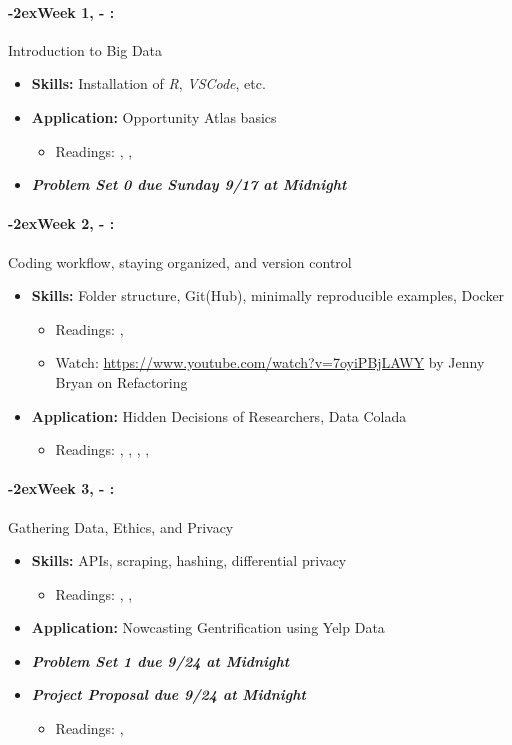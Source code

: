 \documentclass[11pt]{article}
\newcommand{\week}[1]{%
  \paragraph*{\kern-2ex\quad #1, \AdvanceDate[1]\syldate{\today} - \AdvanceDate[2]\syldate{\today}:}%
  \ifdim\wd1=\wd\MONDAY
    \AdvanceDate[7]
  \else
    \AdvanceDate[7]
  \fi%
}
\begin{document}
\normalsize

\SetDate[28/08/2023]
\week{Week 1} Introduction to Big Data
\begin{itemize}
  \item \textbf{Skills:} Installation of \textit{R}, \textit{VSCode}, etc.
  \item \textbf{Application:} Opportunity Atlas basics
  \begin{itemize}
    \item Readings: \textbf{\cite{chetty2018opportunityatlas}}, \cite{chetty2020opportunity}, \cite{einav2014ageofbigdata}
  \end{itemize}
  \item \textit{\textbf{Problem Set 0 due Sunday 9/17 at Midnight}}
\end{itemize}
\week{Week 2} Coding workflow, staying organized, and version control
\begin{itemize}
  \item \textbf{Skills:} Folder structure, Git(Hub), minimally reproducible examples, Docker
  \begin{itemize}
    \item Readings: \textbf{\cite{gentzkowshapiro2014code}}, \cite{mcdermott2022docker}
    \item Watch: \url{https://www.youtube.com/watch?v=7oyiPBjLAWY} by Jenny Bryan on Refactoring
  \end{itemize}
  \item \textbf{Application:} Hidden Decisions of Researchers, Data Colada
  \begin{itemize}
    \item Readings: \textbf{\cite{huntingtonklen2021influence}}, \cite{tinyverse}, \cite{wickhamtidy}, \cite{datacolada2021groundhog}, \cite{datacolada2022groundhog}
  \end{itemize}
\end{itemize}
\week{Week 3} Gathering Data, Ethics, and Privacy
\begin{itemize}
\item \textbf{Skills:} APIs, scraping, hashing, differential privacy
\begin{itemize}
  \item Readings: \textbf{\cite{chetty2019privacy}}, \cite{abowd2019privacy}, \cite{apiintro}
\end{itemize}
\item \textbf{Application:} Nowcasting Gentrification using Yelp Data
\item \textit{\textbf{Problem Set 1 due 9/24 at Midnight}}
\item \textit{\textbf{Project Proposal due 9/24 at Midnight}}
\begin{itemize}
  \item Readings: \textbf{\cite{glaeser2018gentrification}}, \cite{glaeser2017local}
\end{itemize}
\end{itemize} 
\end{document}
